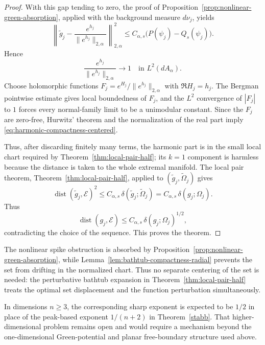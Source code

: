 \documentclass[a4paper,10pt]{amsart}
\begin{document}
\begin{proof}
With this gap tending to zero, the proof of
Proposition~\ref{prop:nonlinear-green-absorption}, applied with the background
measure $d\nu_j$, yields
\[
\left\|
\widetilde g_j-
\frac{e^{h_j}}{\|e^{h_j}\|_{2,\alpha}}
\right\|_{2,\alpha}^2
\le
C_{\alpha,s}\bigl(P(\psi_j)-Q_s(\psi_j)\bigr).
\]
Hence
\[
\frac{e^{h_j}}{\|e^{h_j}\|_{2,\alpha}}\to1
\quad\text{in }L^2(dA_\alpha).
\]
Choose holomorphic functions $F_j=e^{H_j}/\|e^{h_j}\|_{2,\alpha}$ with
$\Re H_j=h_j$. The Bergman pointwise estimate gives local boundedness of
$F_j$, and the $L^2$ convergence of $|F_j|$ to $1$ forces every normal-family
limit to be a unimodular constant. Since the $F_j$ are zero-free, Hurwitz'
theorem and the normalization of the real part imply
\eqref{eq:harmonic-compactness-centered}.

Thus, after discarding finitely many terms, the harmonic part is in the small
local chart required by Theorem~\ref{thm:local-pair-half}; its $k=1$ component
is harmless because the distance is taken to the whole extremal manifold. The
local pair theorem,
Theorem~\ref{thm:local-pair-half}, applied to
$(\widetilde g_j,\widetilde\Omega_j)$ gives
\[
\operatorname{dist}(\widetilde g_j,\mathcal E)^2
\le
C_{\alpha,s}\,\delta(\widetilde g_j;\widetilde\Omega_j)
=
C_{\alpha,s}\,\delta(g_j;\Omega_j).
\]
Thus
\[
\operatorname{dist}(g_j,\mathcal E)
\le
C_{\alpha,s}\,\delta(g_j;\Omega_j)^{1/2},
\]
contradicting the choice of the sequence. This proves the theorem.
\end{proof}

\begin{numrem}
The nonlinear spike obstruction is absorbed by
Proposition~\ref{prop:nonlinear-green-absorption}, while
Lemma~\ref{lem:bathtub-compactness-radial} prevents the set from drifting in
the normalized chart. Thus no separate centering of the set is needed: the
perturbative bathtub expansion in Theorem~\ref{thm:local-pair-half} treats the
optimal set displacement and the function perturbation simultaneously.
\end{numrem}

In dimensions $n\ge 3$, the corresponding sharp exponent is expected to be
$1/2$ in place of the peak-based exponent $1/(n+2)$ in Theorem~\ref{stabb}.
That higher-dimensional problem remains open and would require a mechanism
beyond the one-dimensional Green-potential and planar free-boundary structure
used above.

\end{document}
